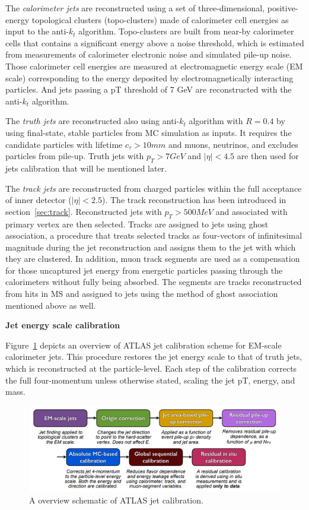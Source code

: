The \textit{calorimeter jets} are reconstructed using a set of three-dimensional, positive-energy topological clusters (topo-clusters) made of calorimeter cell energies as input to the anti-$k_{t}$ algorithm\cite{Aaboud:2017jcu}.
Topo-clusters are built from near-by calorimeter cells that contains a significant energy above a noise threshold,
which is estimated from measurements of calorimeter electronic noise and simulated pile-up noise.
Those calorimeter cell energies are measured at electromagnetic energy scale (EM scale) corresponding to the energy deposited by electromagnetically interacting particles. 
And jets passing a pT threshold of 7 GeV are reconstructed with the anti-$k_{t}$ algorithm.

The \textit{truth jets} are reconstructed also using anti-$k_{t}$ algorithm with $R = 0.4$ by using final-state, stable particles from MC simulation as inputs.
It requires the candidate particles with lifetime $c_{\tau} > 10mm$ and muons, neutrinos, and excludes particles from pile-up.
Truth jets with $p_{T} > 7 GeV$ and $|\eta| < 4.5$ are then used for jets calibration that will be mentioned later.

The \textit{track jets} are reconstructed from charged particles within the full acceptance of inner detector ($|\eta| < 2.5$).
The track reconstruction has been introduced in section~\ref{sec:track}.
Reconstructed jets with $p_{T} > 500 MeV$ and associated with primary vertex are then selected.
Tracks are assigned to jets using ghost association\cite{CACCIARI2008119}, a procedure that treats selected tracks as four-vectors of infinitesimal magnitude during the jet reconstruction and assigns them to the jet with which they are clustered.
In addition, muon track segments are used as a compensation for those uncaptured jet energy from energetic particles passing through the calorimeters without fully being absorbed.
The segments are tracks reconstructed from hits in MS and assigned to jets using the method of ghost association mentioned above as well.

\textbf{Jet energy scale calibration}

Figure~\ref{fig:jet_cali} depicts an overview of ATLAS jet calibration scheme for EM-scale calorimeter jets.
This procedure restores the jet energy scale to that of truth jets, which is reconstructed at the particle-level.
Each step of the calibration corrects the full four-momentum unless otherwise stated, scaling the jet pT, energy, and mass.
\begin{figure}[!htb]
  \centering
  \includegraphics[width=1.0\textwidth]{figures/Simulation/jet_calibration.png}
  \caption{A overview schematic of ATLAS jet calibration\cite{Aaboud:2017jcu}.}
  \label{fig:jet_cali}
\end{figure}

